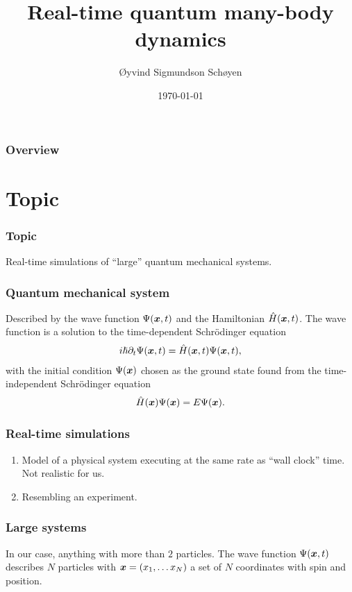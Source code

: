 \documentclass{beamer}
\author{Øyvind Sigmundson Schøyen}
\title{Real-time quantum many-body dynamics}
\institute{University of Oslo}
\date{\today}
\begin{document}
\begin{frame}
    \titlepage
\end{frame}

\begin{frame}
    \frametitle{Overview}
    \tableofcontents
\end{frame}

\section{Topic}

\begin{frame}
    \frametitle{Topic}
    Real-time simulations of ``large'' quantum mechanical systems.
\end{frame}

\begin{frame}
    \frametitle{Quantum mechanical system}
    Described by the wave function $\Psi(\boldsymbol{x}, t)$ and the Hamiltonian
    $\hat{H}(\boldsymbol{x}, t)$.
    The wave function is a solution to the time-dependent Schrödinger equation
    \begin{align}
        i\hslash \partial_t\Psi(\boldsymbol{x}, t)
        = \hat{H}(\boldsymbol{x}, t)\Psi(\boldsymbol{x}, t),
    \end{align}
    with the initial condition $\Psi(\boldsymbol{x})$ chosen as the ground state found
    from the time-independent Schrödinger equation
    \begin{align}
        \hat{H}(\boldsymbol{x})\Psi(\boldsymbol{x}) = E\Psi(\boldsymbol{x}).
    \end{align}
\end{frame}

\begin{frame}
    \frametitle{Real-time simulations}
    \begin{enumerate}
        \item Model of a physical system executing at the same rate as ``wall
            clock'' time.
            Not realistic for us.
        \item Resembling an experiment.
    \end{enumerate}
\end{frame}

\begin{frame}
    \frametitle{Large systems}
    In our case, anything with more than $2$ particles.
    The wave function $\Psi(\boldsymbol{x}, t)$ describes $N$ particles with $\boldsymbol{x} =
    (x_1, \dots x_N)$ a set of $N$ coordinates with spin and position.
\end{frame}
\end{document}

